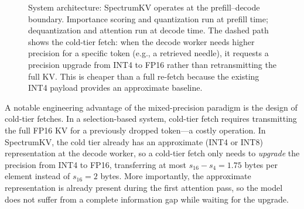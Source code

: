 \documentclass[11pt]{article}
\newcommand{\method}{SpectrumKV}
\theoremstyle{plain}
\theoremstyle{definition}
\begin{document}
\begin{figure}[t]
{%
}
\caption{System architecture: \method{} operates at the prefill--decode boundary.  Importance scoring and quantization run at prefill time; dequantization and attention run at decode time.  The dashed path shows the cold-tier fetch: when the decode worker needs higher precision for a specific token (e.g., a retrieved needle), it requests a precision upgrade from INT4 to FP16 rather than retransmitting the full KV.  This is cheaper than a full re-fetch because the existing INT4 payload provides an approximate baseline.}
\label{fig:sysarch}
\end{figure}

A notable engineering advantage of the mixed-precision paradigm is the design of cold-tier fetches.  In a selection-based system, cold-tier fetch requires transmitting the full FP16 KV for a previously dropped token---a costly operation.  In \method{}, the cold tier already has an approximate (INT4 or INT8) representation at the decode worker, so a cold-tier fetch only needs to \emph{upgrade} the precision from INT4 to FP16, transferring at most $s_{16}-s_4 = 1.75$ bytes per element instead of $s_{16} = 2$ bytes.  More importantly, the approximate representation is already present during the first attention pass, so the model does not suffer from a complete information gap while waiting for the upgrade.
\end{document}
